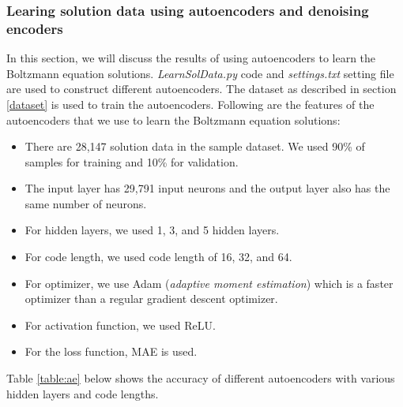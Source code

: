 \documentclass{article}
\begin{document}
\subsubsection{Learing solution data using autoencoders and denoising encoders}
In this section, we will discuss the results of using autoencoders to learn the Boltzmann equation solutions. \emph{LearnSolData.py} code and \emph{settings.txt} setting file are used to construct different autoencoders. The dataset as described in section \ref{dataset} is used to train the autoencoders.  Following are the features of the autoencoders that we use to learn the Boltzmann equation solutions:
\begin{itemize}
	\item There are 28,147 solution data in the sample dataset. We used 90\% of samples for training and 10\% for validation.
	\item The input layer has 29,791 input neurons and the output layer also has the same number of neurons.
	\item For hidden layers, we used 1, 3, and 5 hidden layers.
	\item For code length, we used code length of 16, 32, and 64.
	\item For optimizer, we use Adam (\emph{adaptive moment estimation}) which is a faster optimizer than a regular gradient descent optimizer.
	\item For activation function, we used ReLU.
	\item For the loss function, MAE is used.
\end{itemize}
Table \ref{table:ae} below shows the accuracy of different autoencoders with various hidden layers and code lengths.
\end{document}
